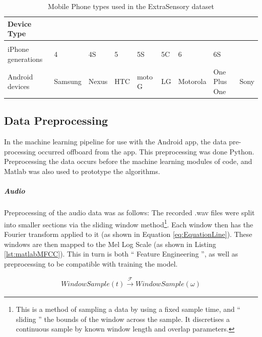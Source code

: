 \documentclass{UoNMCHA}
\newcommand{\inlineQuote}[1]{`` #1 ''}
\newcommand{\lref}[1] {Listing \ref{#1}}
\newcommand{\eref}[1] {Equation \ref{#1}}
\numberwithin{equation}{section}
\begin{document}
\begin{table}[]    
    \begin{center}
        \caption{Mobile Phone types used in the ExtraSensory dataset}\label{tab:ExtraSensoryPhones}
        \begin{tabular}{lllllllll}
            \hline \hline 
            Device Type         &         &        &    &         &    &         &              &      \\
            \hline                                                                                     \\
            iPhone generations  & 4       & 4S    & 5   & 5S     & 5C & 6        & 6S           &      \\
            Android devices     & Samsung & Nexus & HTC & moto G & LG & Motorola & One Plus One & Sony \\
            \hline 
        \end{tabular}
    \end{center}
\end{table}

\subsection{Data Preprocessing}
In the machine learning pipeline for use with the Android app, the data pre-processing occurred offboard from the app. This preprocessing was done Python. Preprocessing the data occurs before the machine learning modules of code, and Matlab was also used to prototype the algorithms.

\subparagraph{Audio}
Preprocessing of the audio data was as follows:
The recorded .wav files were split into smaller sections via the sliding window method\footnote{This is a method of sampling a data by using a fixed sample time, and \inlineQuote{sliding} the bounds of the window across the sample. It discretises a continuous sample by known window length and overlap parameters.}. Each window then has the Fourier transform applied to it (as shown in \eref{eq:EquationLine}). These windows are then mapped to the Mel Log Scale (as shown in \lref{lst:matlabMFCC}). This in turn is both \inlineQuote{Feature Engineering}, as well as preprocessing to be compatible with training the model. 

\begin{gather}\label{eq:EquationLine}
    WindowSample(t) \xrightarrow{\mathscr{F}}  WindowSample(\omega)
\end{gather}
\end{document}
